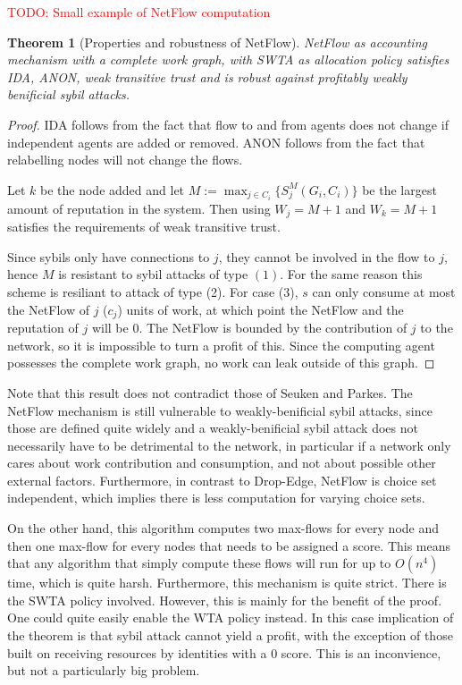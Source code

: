 \documentclass[a4paper,11pt]{book}
\newcommand\musthave[1]{\textcolor{red}{TODO: #1}}
\newtheorem{theorem}{Theorem}
\theoremstyle{definition}
\begin{document}
\musthave{Small example of NetFlow computation}

\begin{theorem}[Properties and robustness of NetFlow]
    NetFlow as accounting mechanism with a complete work graph, with SWTA as allocation policy
    satisfies IDA, ANON, weak transitive trust and is robust against
    profitably weakly benificial sybil attacks.

    \label{thm:prop-rob-NetFlow}
\end{theorem}


\begin{proof}
    IDA follows from the fact that flow to and from agents does not change if independent agents
    are added or removed. ANON follows from the fact that relabelling nodes will not change the flows.

    Let $k$ be the node added and let 
    $M := \max_{j \in C_i}\{S^M_j(G_i, C_i)\}$ be the largest amount of reputation in the system.
    Then using $W_j = M+1$ and $W_k = M+1$ satisfies the requirements of weak transitive trust.

    Since sybils only have connections to $j$, they cannot be involved in the flow to $j$, hence
    $M$ is resistant to sybil attacks of type $(1)$. For the same reason this scheme is resiliant
    to attack of type (2). For case (3), $s$ can only consume at most the NetFlow of $j$ ($c_j$)
    units of work, at which point the NetFlow and the reputation of $j$ will be $0$. The NetFlow
    is bounded by the contribution of $j$ to the network, so it is impossible to turn a profit of this.
    Since the computing agent possesses the complete work graph, no work can leak outside of this graph.
\end{proof}

Note that this result does not contradict those of Seuken and Parkes. The NetFlow mechanism is
still vulnerable to weakly-benificial sybil attacks, since those are defined quite widely and
a weakly-benificial sybil attack does not necessarily have to be detrimental to the network,
in particular if a network only cares about work contribution and consumption, and
not about possible other external factors. Furthermore, in contrast to Drop-Edge, NetFlow
is choice set independent, which implies there is less computation for varying choice sets.


On the other hand, this algorithm computes two max-flows for every node and then one max-flow for
every nodes that needs to be assigned a score. This means that any algorithm that simply compute
these flows will run for up to $O(n^4)$ time, which is quite harsh. 
Furthermore, this mechanism is quite strict. There is the SWTA policy involved. However,
this is mainly for the benefit of the proof. One could quite easily enable the WTA policy instead.
In this case implication of the theorem is that sybil attack cannot yield a profit, with the exception
of those built on receiving resources by identities with a $0$ score. This is an inconvience,
but not a particularly big problem. 
\end{document}
